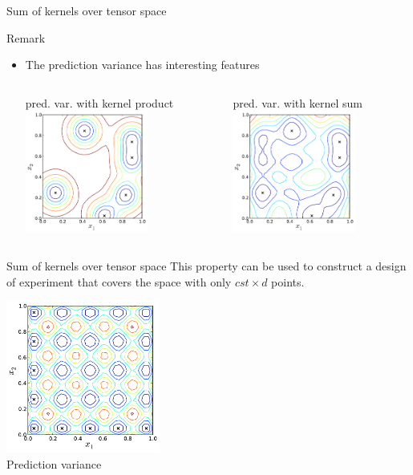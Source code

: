 \documentclass{beamer}
\begin{document}
\begin{frame}{Sum of kernels over tensor space}
\begin{block}{Remark}%
\begin{itemize}
\item The prediction variance has interesting features
\begin{columns}[c]
\begin{column}{5cm}
\begin{center}
pred. var. with kernel product
\includegraphics[height=4cm]{figures/python/kernelmodels-predvarprod}
\end{center}
\end{column}
\begin{column}{5cm}
\begin{center}
pred. var. with kernel sum
\includegraphics[height=4cm]{figures/python/kernelmodels-predvar}
\end{center}
\end{column}
\end{columns}
\end{itemize} 
\end{block}
\end{frame}

\begin{frame}{Sum of kernels over tensor space}
This property can be used to construct a design of experiment that covers the space with only $cst \times d$ points.
\begin{center}
\includegraphics[height=5cm]{figures/python/kernelmodels-predaxe}\\
Prediction variance
\end{center}
\vfill
\end{frame}
\end{document}
